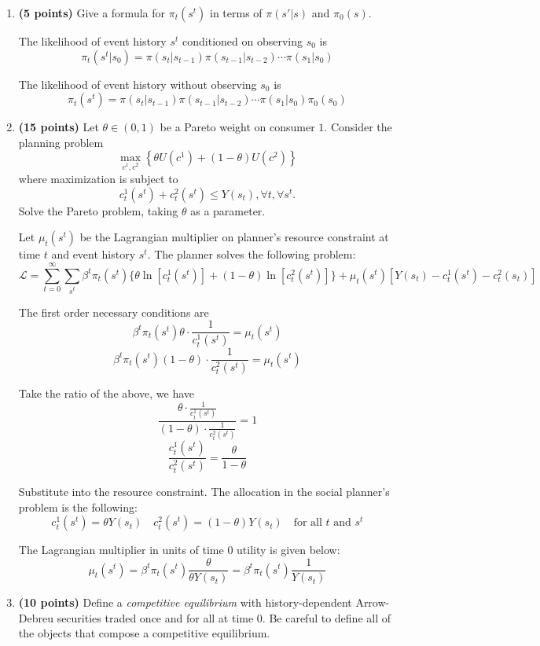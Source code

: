\documentclass[12pt, oneside]{article}
\begin{document}
\begin{enumerate}
\begin{enumerate}
\item \textbf{(5 points)} Give a formula for $\pi_t(s^t)$ in terms of $\pi(s'|s)$ and $\pi_0(s)$.

The likelihood of event history $s^t$ conditioned on observing $s_0$ is
\[ \pi_t(s^t|s_0) = \pi(s_t|s_{t-1})\pi(s_{t-1}|s_{t-2})\cdots\pi(s_1|s_0) \]

The likelihood of event history without observing $s_0$ is
\[ \pi_t(s^t) = \pi(s_t|s_{t-1})\pi(s_{t-1}|s_{t-2})\cdots\pi(s_1|s_0)\pi_0(s_0) \]

\item \textbf{(15 points)} Let $\theta \in (0,1)$ be a Pareto weight on consumer $1$.  Consider the planning problem
$$ \max_{c^1, c^2} \left\{ \theta U(c^1) + (1-\theta) U(c^2)
  \right\}  $$
where  maximization is subject to
$$ c_t^1(s^t) + c_t^2(s^t) \leq Y(s_t), \forall t, \forall s^t . $$
Solve the Pareto problem, taking $\theta$ as a parameter.

Let $\mu_t(s^t)$ be the Lagrangian multiplier on planner's resource constraint at time $t$ and event history $s^t$. The planner solves the following problem:
\[ \mathcal{L} = \sum_{t=0}^\infty \sum_{s^t} \beta^t \pi_t(s^t) \{\theta \ln[c_t^1(s^t)] + (1-\theta) \ln[c_t^2(s^t)]\} + \mu_t(s^t) [Y(s_t) - c_t^1(s^t) - c_t^2(s_t)]  \]

The first order necessary conditions are
\[ \beta^t \pi_t(s^t) \theta \cdot \frac{1}{c_t^1(s^t)} = \mu_t(s^t) \]
\[ \beta^t \pi_t(s^t) (1-\theta) \cdot \frac{1}{c_t^2(s^t)} = \mu_t(s^t) \]

Take the ratio of the above, we have
\[ \frac{\theta \cdot \frac{1}{c_t^1(s^t)} }{ (1-\theta) \cdot \frac{1}{c_t^2(s^t)} } = 1 \]
\[ \frac{c_t^1(s^t)}{c_t^2(s^t)} = \frac{\theta}{1-\theta} \]

Substitute into the resource constraint. The allocation in the social planner's problem is the following:
\[ c_t^1(s^t) = \theta Y(s_t) \quad c_t^2(s^t) = (1-\theta) Y(s_t) \quad \mbox{for all $t$ and $s^t$} \]

The Lagrangian multiplier in units of time $0$ utility is given below:
\[ \mu_t(s^t) = \beta^t \pi_t(s^t) \frac{\theta}{\theta Y(s_t)} =\beta^t \pi_t(s^t) \frac{1}{Y(s_t)} \]

\item \textbf{(10 points)} Define a {\it competitive equilibrium} with
history-dependent Arrow-Debreu  securities traded once and for all
at time $0$.  Be careful to define all of the objects that compose
a competitive equilibrium.


\end{enumerate}
\end{enumerate}
\end{document}
